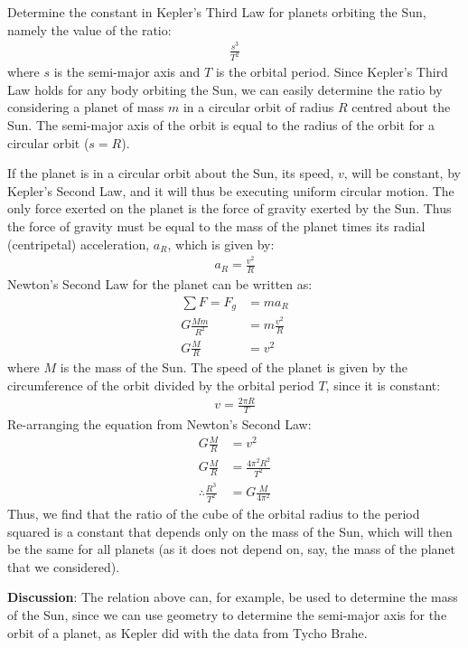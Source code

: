 \begin{example}{\label{ex:gravity:keplerconstant}Determine the constant in Kepler's Third Law for planets orbiting the Sun, namely the value of the ratio:
\begin{align*}
\frac{s^3}{T^2}
\end{align*}
where $s$ is the semi-major axis and $T$ is the orbital period.
}
Since Kepler's Third Law holds for any body orbiting the Sun, we can easily determine the ratio by considering a planet of mass $m$ in a circular orbit of radius $R$ centred about the Sun. The semi-major axis of the orbit is equal to the radius of the orbit for a circular orbit ($s=R$).

If the planet is in a circular orbit about the Sun, its speed, $v$, will be constant, by Kepler's Second Law, and it will thus be executing uniform circular motion. The only force exerted on the planet is the force of gravity exerted by the Sun. Thus the force of gravity must be equal to the mass of the planet times its radial (centripetal) acceleration, $a_R$, which is given by:
\begin{align*}
a_R=\frac{v^2}{R}
\end{align*}
Newton's Second Law for the planet can be written as:
\begin{align*}
\sum F = F_g &= ma_R\\
G\frac{Mm}{R^2}&=m\frac{v^2}{R}\\
G\frac{M}{R}&=v^2
\end{align*}
where $M$ is the mass of the Sun. The speed of the planet is given by the circumference of the orbit divided by the orbital period $T$, since it is constant:
\begin{align*}
v=\frac{2\pi R}{T}
\end{align*}
Re-arranging the equation from Newton's Second Law:
\begin{align*}
G\frac{M}{R}&=v^2\\
G\frac{M}{R}&=\frac{4\pi^2 R^2}{T^2}\\
\therefore \frac{R^3}{T^2}&=G\frac{M}{4\pi^2}
\end{align*}
Thus, we find that the ratio of the cube of the orbital radius to the period squared is a constant that depends only on the mass of the Sun, which will then be the same for all planets (as it does not depend on, say, the mass of the planet that we considered).

\textbf{Discussion}: The relation above can, for example, be used to determine the mass of the Sun, since we can use geometry to determine the semi-major axis for the orbit of a planet, as Kepler did with the data from Tycho Brahe.
\end{example}


